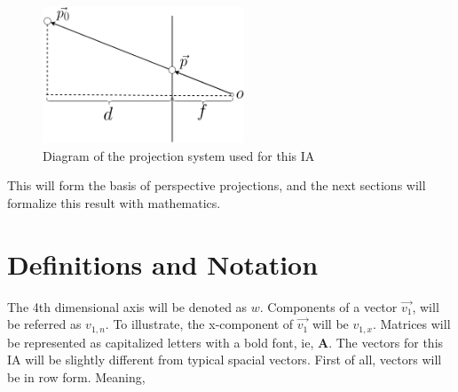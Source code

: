 \documentclass[12pt, letterpaper]{article}
\begin{document}
\begin{figure}[H]
\centering
\includegraphics[width=6cm]{edited_eye.png}
\caption{Diagram of the projection system used for this IA}
\label{fig:figure}
\end{figure} 
This will form the basis of perspective projections, and the next sections will formalize this result with mathematics.

\section{Definitions and Notation}
The 4th dimensional axis will be denoted as $w$. Components of a vector $\vec{v_1}$, will be referred as $v_{1,n}$. To illustrate, the x-component of $\vec{v_1}$ will be $v_{1,x}$. Matrices will be represented as capitalized letters with a bold font, ie, $\mathbf{A}$. The vectors for this IA will be slightly different from typical spacial vectors. First of all, vectors will be in row form. Meaning, 
\end{document}
